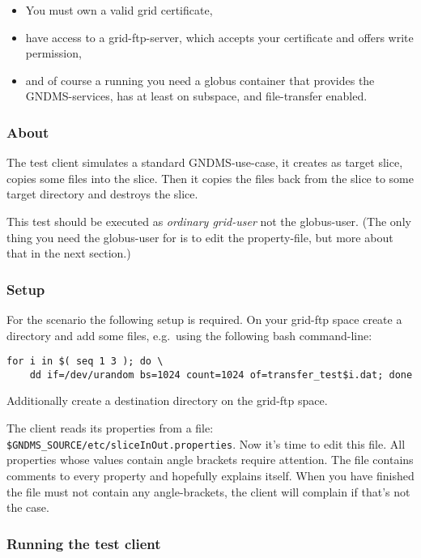 \documentclass{article}
\begin{document}
\begin{itemize}
\item
  You must own a valid grid certificate,
\item
  have access to a grid-ftp-server, which accepts your certificate
  and offers write permission,
\item
  and of course a running you need a globus container that provides the
  GNDMS-services, has at least on subspace, and file-transfer
  enabled.
\end{itemize}
\subsubsection{About}

The test client simulates a standard GNDMS-use-case, it creates as
target slice, copies some files into the slice. Then it copies the
files back from the slice to some target directory and destroys the
slice.

This test should be executed as \textit{ordinary grid-user} not the
globus-user. (The only thing you need the globus-user for is to
edit the property-file, but more about that in the next section.)

\subsubsection{Setup}

For the scenario the following setup is required. On your grid-ftp
space create a directory and add some files, e.g.~using the
following bash command-line:

\begin{verbatim}
for i in $( seq 1 3 ); do \
    dd if=/dev/urandom bs=1024 count=1024 of=transfer_test$i.dat; done
\end{verbatim}

Additionally create a destination directory on the grid-ftp space.

The client reads its properties from a file:
\verb!$GNDMS_SOURCE/etc/sliceInOut.properties!. Now it's time to
edit this file. All properties whose values contain angle brackets
require attention. The file contains comments to every property and
hopefully explains itself. When you have finished the file must not
contain any angle-brackets, the client will complain if that's not
the case.

\subsubsection{Running the test client}
\end{document}
